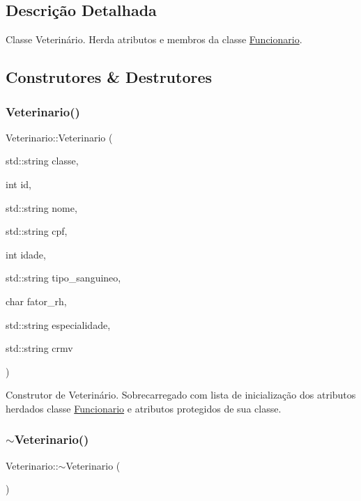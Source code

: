 \subsection{Descrição Detalhada}
Classe Veterinário. Herda atributos e membros da classe \hyperlink{classFuncionario}{Funcionario}. 

\subsection{Construtores \& Destrutores}
\mbox{\label{classVeterinario_a1b71c4d5905ec467930ef2b996d8d7ab}} 
\subsubsection{\texorpdfstring{Veterinario()}{Veterinario()}}
{\footnotesize\ttfamily Veterinario\+::\+Veterinario (\begin{DoxyParamCaption}\item[{std\+::string}]{classe,  }\item[{int}]{id,  }\item[{std\+::string}]{nome,  }\item[{std\+::string}]{cpf,  }\item[{int}]{idade,  }\item[{std\+::string}]{tipo\+\_\+sanguineo,  }\item[{char}]{fator\+\_\+rh,  }\item[{std\+::string}]{especialidade,  }\item[{std\+::string}]{crmv }\end{DoxyParamCaption})}

Construtor de Veterinário. Sobrecarregado com lista de inicialização dos atributos herdados classe \hyperlink{classFuncionario}{Funcionario} e atributos protegidos de sua classe. \mbox{\label{classVeterinario_a0de805e30bc7006d2035458f80c18671}} 
\subsubsection{\texorpdfstring{$\sim$\+Veterinario()}{~Veterinario()}}
{\footnotesize\ttfamily Veterinario\+::$\sim$\+Veterinario (\begin{DoxyParamCaption}{ }\end{DoxyParamCaption})}

